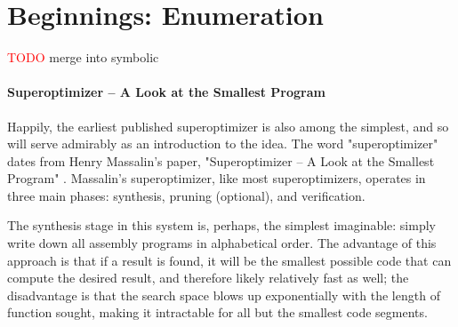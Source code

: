 \documentclass[12pt,twoside]{reedthesis}
\newcommand{\red}[1]{\textcolor{red}{#1}}
\begin{document}

\chapter{Beginnings: Enumeration}
\red{TODO} merge into symbolic

\subsubsection{Superoptimizer -- A Look at the Smallest Program}
Happily, the earliest published superoptimizer is also among the simplest, and so will serve admirably as an introduction to the idea. 
The word "superoptimizer" dates from Henry Massalin's paper, "Superoptimizer -- A Look at the Smallest Program" \cite{massalin1987superoptimizer}.
Massalin's superoptimizer, like most superoptimizers, operates in three main phases: synthesis, pruning (optional), and verification.

The synthesis stage in this system is, perhaps, the simplest imaginable: simply write down all assembly programs in alphabetical order.
The advantage of this approach is that if a result is found, it will be the smallest possible code that can compute the desired result, and therefore likely relatively fast as well;
the disadvantage is that the search space blows up exponentially with the length of function sought, making it intractable for all but the smallest code segments.
\end{document}

